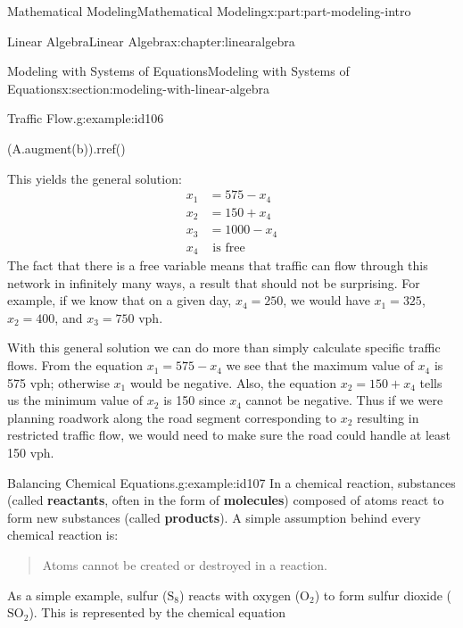 \documentclass[oneside,10pt,]{book}
\newcommand{\terminology}[1]{\textbf{#1}}
\numberwithin{equation}{section}
\begin{document}
\begin{partptx}{Mathematical Modeling}{}{Mathematical Modeling}{}{}{x:part:part-modeling-intro}
\begin{chapterptx}{Linear Algebra}{}{Linear Algebra}{}{}{x:chapter:linearalgebra}
\begin{sectionptx}{Modeling with Systems of Equations}{}{Modeling with Systems of Equations}{}{}{x:section:modeling-with-linear-algebra}
\begin{example}{Traffic Flow.}{g:example:id106}
\begin{sageoutput}
[   1    0    0    1  575]
[   0    0    1    1 1000]
[   0    1    1    0 1150]
\end{sageoutput}
\begin{sageinput}
(A.augment(b)).rref()
\end{sageinput}
\begin{sageoutput}
[   1    0    0    1  575]
[   0    1    0   -1  150]
[   0    0    1    1 1000]
[   0    0    0    0    0]
\end{sageoutput}
This yields the general solution:%
%
\begin{equation*}
\begin{aligned}
x_1 & = 575 - x_4 \\
x_2 & = 150 + x_4 \\
x_3 & = 1000 - x_4 \\
x_4 & \text{ is free}
\end{aligned}
\end{equation*}
The fact that there is a free variable means that traffic can flow through this network in infinitely many ways, a result that should not be surprising. For example, if we know that on a given day, \(x_4 = 250\), we would have \(x_1 = 325\), \(x_2 = 400\), and \(x_3 = 750\) vph.%
\par
With this general solution we can do more than simply calculate specific traffic flows. From the equation \(x_1 = 575-x_4\) we see that the maximum value of \(x_4\) is 575 vph; otherwise \(x_1\) would be negative. Also, the equation \(x_2 = 150+x_4\) tells us the minimum value of \(x_2\) is 150 since \(x_4\) cannot be negative. Thus if we were planning roadwork along the road segment corresponding to \(x_2\) resulting in restricted traffic flow, we would need to make sure the road could handle at least 150 vph.%
\end{example}
\begin{example}{Balancing Chemical Equations.}{g:example:id107}%
In a chemical reaction, substances (called \terminology{reactants}, often in the form of \terminology{molecules}) composed of atoms react to form new substances (called \terminology{products}). A simple assumption behind every chemical reaction is:%
\begin{quote}%
Atoms cannot be created or destroyed in a reaction.\end{quote}
As a simple example, sulfur (\(\text{S}_8\)) reacts with oxygen (\(\text{O}_2\)) to form sulfur dioxide (\(\text{SO}_2\)). This is represented by the chemical equation%
%
\begin{equation*}

\end{equation*}
\end{example}
\end{sectionptx}
\end{chapterptx}
\end{partptx}
\end{document}
